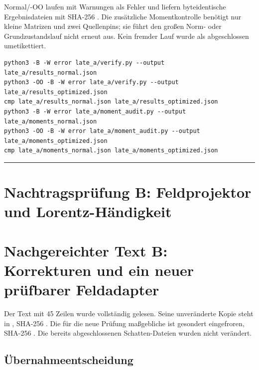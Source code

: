 Normal/-OO laufen mit Warnungen als Fehler und liefern byteidentische
Ergebnisdateien mit SHA-256
.
Die zusätzliche Momentkontrolle benötigt nur kleine Matrizen und zwei
Quellenpins; sie führt den großen Norm- oder Grundzustandslauf nicht
erneut aus. Kein fremder Lauf wurde als abgeschlossen umetikettiert.

\begin{verbatim}
python3 -B -W error late_a/verify.py --output late_a/results_normal.json
python3 -OO -B -W error late_a/verify.py --output late_a/results_optimized.json
cmp late_a/results_normal.json late_a/results_optimized.json
python3 -B -W error late_a/moment_audit.py --output late_a/moments_normal.json
python3 -OO -B -W error late_a/moment_audit.py --output late_a/moments_optimized.json
cmp late_a/moments_normal.json late_a/moments_optimized.json
\end{verbatim}

\begin{center}\rule{0.5\linewidth}{0.5pt}\end{center}

\section{Nachtragsprüfung B: Feldprojektor und
Lorentz-Händigkeit}\label{nachtragspruxfcfung-b-feldprojektor-und-lorentz-huxe4ndigkeit}

\section{Nachgereichter Text B: Korrekturen und ein neuer prüfbarer
Feldadapter}\label{nachgereichter-text-b-korrekturen-und-ein-neuer-pruxfcfbarer-feldadapter}

Der Text mit 45 Zeilen wurde vollständig gelesen. Seine unveränderte
Kopie steht in , SHA-256
.
Die für die neue Prüfung maßgebliche  ist
gesondert eingefroren, SHA-256
.
Die bereits abgeschlossenen Schatten-Dateien wurden nicht verändert.

\subsection{Übernahmeentscheidung}\label{uxfcbernahmeentscheidung}

